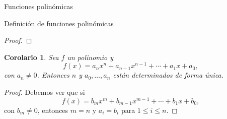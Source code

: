 \documentclass[a4paper,12pt,twoside,spanish,reqno]{amsbook}
\numberwithin{equation}{section}
\newtheorem{corolario}[teorema]{Corolario}
\theoremstyle{definition}
\theoremstyle{remark}
\newcommand{\K}{\mathbb K}
\begin{document}
\begin{chapter}{Funciones polinómicas}
\begin{section}{Definición de funciones polinómicas}
\begin{proof}
\begin{comment}
            Sea $n >0$. Supongamos que el resultado es cierto para los polinomios de grado  $\le n-1$ (hipótesis inductiva). Si $f$ no tiene raíces, está probado nuestro enunciado. En  caso contrario existe $c_1 \in \K$ tal que $f(c_1) =0$. Por el teorema \ref{th-fact-raiz}, 
            \begin{equation*}
            f(x) = (x-c_1)h_1(x)
            \end{equation*}
            con $h_1$ un polinomio de grado $\le n-1$. Luego, por hipótesis inductiva
            \begin{equation*}
            h_1(x) = (x-d_1)(x-d_2)\cdots(x-d_r)g_r,
            \end{equation*} 
            con $r \le n-1$ y $g_r$ que no tiene raíces. Entonces,
            \begin{equation*}
            f(x) = (x-c_1)(x-d_1)(x-d_2)\cdots(x-d_r)g_r,
            \end{equation*}
            con $r \le n-1$ y $g_r$ que no tiene raíces. Esto es equivalente a (\ref{eq-desc-rai}).   
        \end{comment}
        
    \end{proof}
                        
    \begin{corolario}
        Sea $f$ un polinomio y 
        \begin{equation*}
            f(x) = a_nx^n + a_{n-1}x^{n-1}+\cdots + a_1x +a_0,
        \end{equation*}
        con $a_n \ne 0$.  Entonces $n$ y $a_0,\ldots,a_n$ están determinados de forma única.
    \end{corolario}
    \begin{proof}
        Debemos ver que si 
        \begin{equation*}
        f(x) = b_mx^m + b_{m-1}x^{m-1}+\cdots + b_1x +b_0,
        \end{equation*}
        con $b_m \ne 0$, entonces $m=n$ y $a_i=b_i$ para $1 \le i \le n$. 
        

\end{proof}
\end{section}
\end{chapter}
\end{document}
